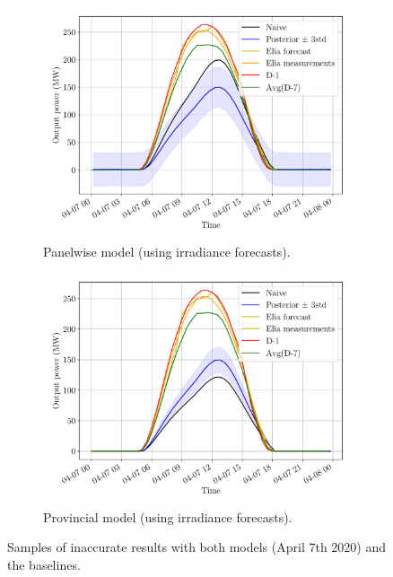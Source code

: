 \documentclass[a4paper, 12pt]{article}
\begin{document}
\begin{figure}[H]
	\centering
	\begin{subfigure}{0.48\textwidth}
		\centering
		\includegraphics[width=\textwidth]{resources/pdf/solar_panelwise_START_FOR_07-04-2020.pdf}
		\caption{Panelwise model (using irradiance forecasts).}
		\label{fig:panelwise_bad_2}
	\end{subfigure}
	\hspace{0.5em}
	\begin{subfigure}{0.48\textwidth}
		\centering
		\includegraphics[width=\textwidth]{resources/pdf/solar_provincial_START_FOR_07-04-2020.pdf}
		\caption{Provincial model (using irradiance forecasts).}
		\label{fig:provincial_bad_2}
	\end{subfigure}
	\caption{Samples of inaccurate results with both models (April 7th 2020) and the baselines.}
	\label{fig:bad_results_april_7th}
\end{figure}
\end{document}
